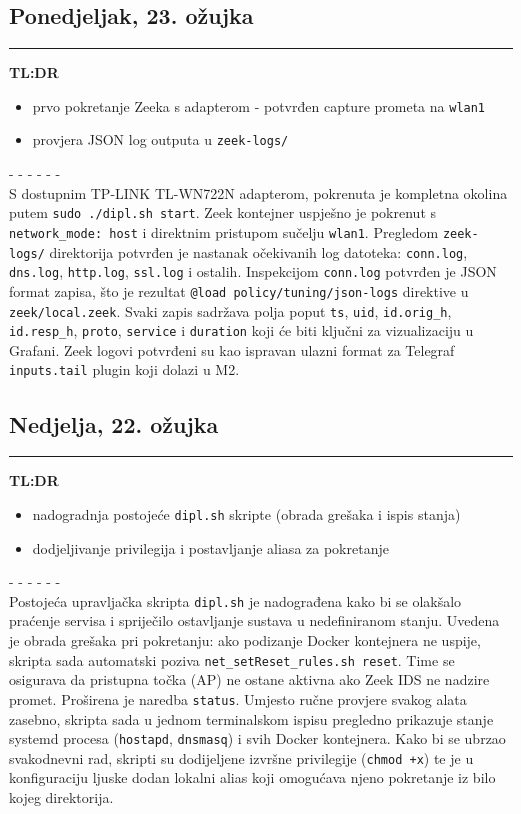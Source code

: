 \documentclass[12pt, a4paper]{article}
\newcommand{\dan}[1]{
    \subsection*{#1}
    \vspace{-0.5em} 
    \hrule \vspace{0.5em} 
}
\begin{document}
\dan{Ponedjeljak, 23. ožujka}
\textbf{TL:DR}
\begin{itemize}
    \item prvo pokretanje Zeeka s adapterom - potvrđen capture prometa na \lstinline|wlan1|
    \item provjera JSON log outputa u \lstinline|zeek-logs/|
\end{itemize}
- - - - - - \\
S dostupnim TP-LINK TL-WN722N adapterom, pokrenuta je kompletna okolina putem
\lstinline|sudo ./dipl.sh start|.
Zeek kontejner uspješno je pokrenut s \lstinline|network_mode: host| i direktnim pristupom
sučelju \lstinline|wlan1|.
Pregledom \lstinline|zeek-logs/| direktorija potvrđen je nastanak očekivanih log datoteka:
\lstinline|conn.log|, \lstinline|dns.log|, \lstinline|http.log|, \lstinline|ssl.log| i ostalih.
Inspekcijom \lstinline|conn.log| potvrđen je JSON format zapisa, što je rezultat
\lstinline|@load policy/tuning/json-logs| direktive u \lstinline|zeek/local.zeek|.
Svaki zapis sadržava polja poput \lstinline|ts|, \lstinline|uid|, \lstinline|id.orig_h|,
\lstinline|id.resp_h|, \lstinline|proto|, \lstinline|service| i \lstinline|duration|
koji će biti ključni za vizualizaciju u Grafani.
Zeek logovi potvrđeni su kao ispravan ulazni format za Telegraf \lstinline|inputs.tail| plugin
koji dolazi u M2.
 
\dan{Nedjelja, 22. ožujka}
\textbf{TL:DR}
\begin{itemize}
    \item nadogradnja postojeće \lstinline|dipl.sh| skripte (obrada grešaka i ispis stanja)
    \item dodjeljivanje privilegija i postavljanje aliasa za pokretanje
\end{itemize}
- - - - - - \\
Postojeća upravljačka skripta \lstinline|dipl.sh| je nadograđena kako bi se olakšalo praćenje 
servisa i spriječilo ostavljanje sustava u nedefiniranom stanju.
Uvedena je obrada grešaka pri pokretanju: ako podizanje Docker kontejnera ne uspije, skripta 
sada automatski poziva \lstinline|net_setReset_rules.sh reset|. Time se osigurava da pristupna 
točka (AP) ne ostane aktivna ako Zeek IDS ne nadzire promet.
Proširena je naredba \lstinline|status|. Umjesto ručne provjere svakog alata zasebno, skripta 
sada u jednom terminalskom ispisu pregledno prikazuje stanje systemd procesa 
(\lstinline|hostapd|, \lstinline|dnsmasq|) i svih Docker kontejnera.
Kako bi se ubrzao svakodnevni rad, skripti su dodijeljene izvršne privilegije 
(\lstinline|chmod +x|) te je u konfiguraciju ljuske dodan lokalni alias koji omogućava njeno 
pokretanje iz bilo kojeg direktorija.
 
\end{document}
